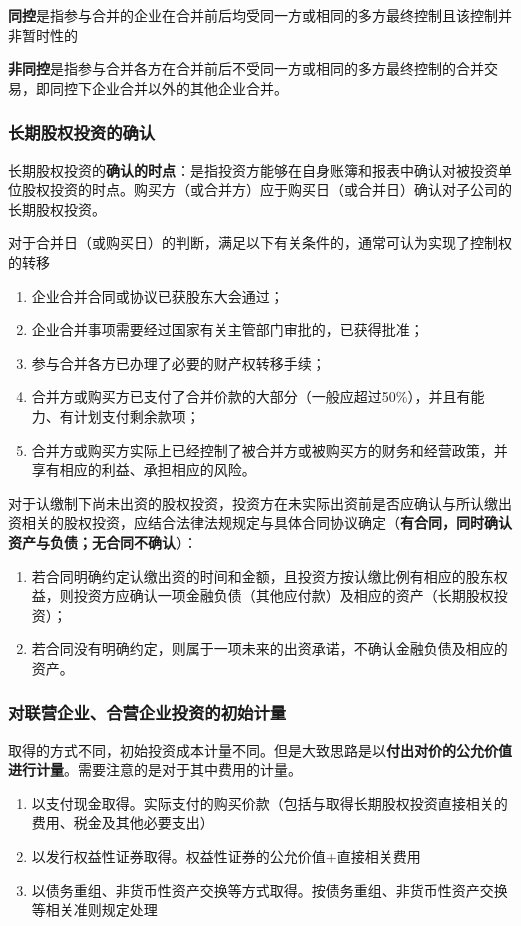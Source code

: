 \documentclass[UTF8,12pt]{ctexart}
\numberwithin{equation}{section} %
\numberwithin{figure}{section}
\numberwithin{table}{section}
\begin{document}
	\textbf{同控}是指参与合并的企业在合并前后均受同一方或相同的多方最终控制且该控制并非暂时性的
	
	\textbf{非同控}是指参与合并各方在合并前后不受同一方或相同的多方最终控制的合并交易，即同控下企业合并以外的其他企业合并。
	
	\subsubsection{长期股权投资的确认}
	长期股权投资的\textbf{确认的时点}：是指投资方能够在自身账簿和报表中确认对被投资单位股权投资的时点。购买方（或合并方）应于购买日（或合并日）确认对子公司的长期股权投资。
	
	对于合并日（或购买日）的判断，满足以下有关条件的，通常可认为实现了控制权的转移
	\begin{enumerate}
		\item 企业合并合同或协议已获股东大会通过；
		
		\item 企业合并事项需要经过国家有关主管部门审批的，已获得批准；
			
		\item 参与合并各方已办理了必要的财产权转移手续；
		
		\item 合并方或购买方已支付了合并价款的大部分（一般应超过50\%），并且有能力、有计划支付剩余款项；
		
		\item 合并方或购买方实际上已经控制了被合并方或被购买方的财务和经营政策，并享有相应的利益、承担相应的风险。
	\end{enumerate}
	
	
	对于认缴制下尚未出资的股权投资，投资方在未实际出资前是否应确认与所认缴出资相关的股权投资，应结合法律法规规定与具体合同协议确定（\textbf{有合同，同时确认资产与负债；无合同不确认}）：
	\begin{enumerate}
		\item 若合同明确约定认缴出资的时间和金额，且投资方按认缴比例有相应的股东权益，则投资方应确认一项金融负债（其他应付款）及相应的资产（长期股权投资）；
		
		\item 若合同没有明确约定，则属于一项未来的出资承诺，不确认金融负债及相应的资产。
	\end{enumerate}

	\subsubsection{对联营企业、合营企业投资的初始计量}
	取得的方式不同，初始投资成本计量不同。但是大致思路是以\textbf{付出对价的公允价值进行计量}。需要注意的是对于其中费用的计量。
	\begin{enumerate}
		\item 以支付现金取得。实际支付的购买价款（包括与取得长期股权投资直接相关的费用、税金及其他必要支出）
		
		\item 以发行权益性证券取得。权益性证券的公允价值+直接相关费用
		
		\item 以债务重组、非货币性资产交换等方式取得。按债务重组、非货币性资产交换等相关准则规定处理
	\end{enumerate}
	
\end{document}
